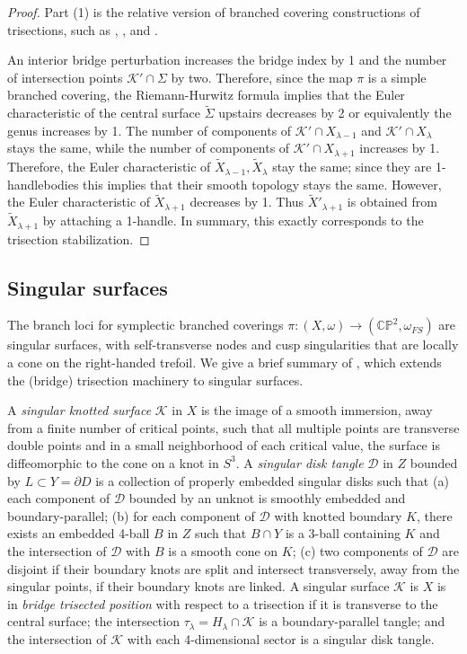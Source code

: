 \documentclass[11pt]{amsart}
\theoremstyle{definition}
\theoremstyle{remark}
\numberwithin{equation}{section}
\newcommand{\cK}{\mathcal{K}}
\newcommand{\cD}{\mathcal{D}}
\newcommand{\CP}{\mathbb{CP}}
\begin{document}
\begin{proof}
Part (1) is the relative version of branched covering constructions of trisections, such as \cite[Theorem 4.1]{LMS}, \cite[Proposition 3.1]{LM-Rational}, and \cite[Proposition 13]{MZ2}.

An interior bridge perturbation increases the bridge index by 1 and the number of intersection points $\cK' \cap \Sigma$ by two.  Therefore, since the map $\pi$ is a simple branched covering, the Riemann-Hurwitz formula implies that the Euler characteristic of the central surface $\widetilde{\Sigma}$ upstairs decreases by 2 or equivalently the genus increases by 1.  The number of components of $\cK' \cap X_{\lambda-1}$ and $\cK' \cap X_{\lambda}$ stays the same, while the number of components of $\cK' \cap X_{\lambda+1}$ increases by 1.  Therefore, the Euler characteristic of $\widetilde{X}_{\lambda-1},\widetilde{X}_{\lambda}$ stay the same; since they are 1-handlebodies this implies that their smooth topology stays the same.  However, the Euler characteristic of $\widetilde{X}_{\lambda+1}$ decreases by 1.  Thus $\widetilde{X}'_{\lambda+1}$ is obtained from $\widetilde{X}_{\lambda+1}$ by attaching a 1-handle.  In summary, this exactly corresponds to the trisection stabilization.
\end{proof}

\subsection{Singular surfaces}

The branch loci for symplectic branched coverings $\pi: (X,\omega) \rightarrow (\CP^2,\omega_{FS})$ are singular surfaces, with self-transverse nodes and cusp singularities that are locally a cone on the right-handed trefoil.  We give a brief summary of \cite[Sections 3 and 4]{LMS}, which extends the (bridge) trisection machinery to singular surfaces.

A {\it singular knotted surface} $\cK$ in $X$ is the image of a smooth immersion, away from a finite number of critical points, such that all multiple points are transverse double points and in a small neighborhood of each critical value, the surface is diffeomorphic to the cone on a knot in $S^3$.  A {\it singular disk tangle} $\cD$ in $Z$ bounded by $L \subset Y = \partial D$ is a collection of properly embedded singular disks such that (a) each component of $\cD$ bounded by an unknot is smoothly embedded and boundary-parallel; (b) for  each component of $\cD$ with knotted boundary $K$, there exists an embedded 4-ball $B$ in $Z$ such that $B \cap Y$ is a 3-ball containing $K$ and the intersection of $\cD$ with $B$ is a smooth cone on $K$; (c) two components of $\cD$ are disjoint if their boundary knots are split and intersect transversely, away from the singular points, if their boundary knots are linked.  A singular surface $\cK$ is $X$ is in {\it bridge trisected position} with respect to a trisection if it is transverse to the central surface; the intersection $\tau_{\lambda} = H_{\lambda} \cap \cK$ is a boundary-parallel tangle; and the intersection of $\cK$ with each 4-dimensional sector is a singular disk tangle.
\end{document}
